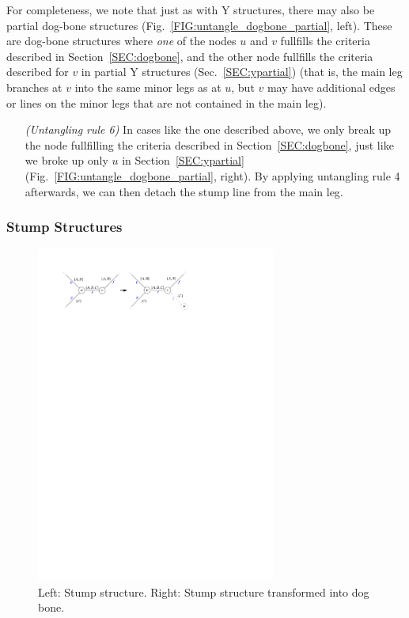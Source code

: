 \documentclass[format=acmsmall, review=false, screen=true]{acmart}
\begin{document}
For completeness, we note that just as with Y structures, there may also be partial dog-bone structures (Fig.~\ref{FIG:untangle_dogbone_partial}, left). These are dog-bone structures where \emph{one} of the nodes $u$ and $v$ fullfills the criteria described in Section~\ref{SEC:dogbone}, and the other node fullfills the criteria described for $v$ in partial Y structures (Sec.~\ref{SEC:ypartial}) (that is, the main leg branches at $v$ into the same minor legs as at $u$, but $v$ may have additional edges or lines on the minor legs that are not contained in the main leg). 
\begin{enumerate}[parsep=0.5mm, wide, labelwidth=0mm, itemindent=2.3mm]
  \setlength\itemsep{1pt}
  \item[\emph{(Untangling rule 6)}] In cases like the one described above, we only break up the node fullfilling the criteria described in Section~\ref{SEC:dogbone}, just like we broke up only $u$ in Section~\ref{SEC:ypartial} (Fig.~\ref{FIG:untangle_dogbone_partial}, right). By applying untangling rule 4 afterwards, we can then detach the stump line from the main leg.
\end{enumerate}

\subsubsection{Stump Structures}

\begin{figure}
  \includegraphics[width=0.7\textwidth, page=1]{untangling/stump.pdf}
  \caption{Left: Stump structure. Right: Stump structure transformed into dog bone.}  
  \label{FIG:untangle_stump}
\end{figure}
\end{document}
